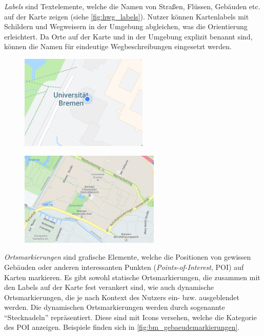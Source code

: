 \emph{Labels} sind Textelemente, welche die Namen von Straßen, Flüssen, Gebäuden etc. auf der Karte zeigen (siehe \autoref{fig:hwg_labels}).
Nutzer können Kartenlabels mit Schildern und Wegweisern in der Umgebung abgleichen, was die Orientierung erleichtert.
Da Orte auf der Karte und in der Umgebung explizit benannt sind, können die Namen für eindeutige Wegbeschreibungen eingesetzt werden.
\begin{figure}[h]
    \centering
    \begin{minipage}[t]{.485\textwidth}
        \centering
        \vspace{0pt}
        \includegraphics[width=\linewidth, height=4.5cm]{figures/map-app_examples/gm_positionsmarker}
        \label{fig:gm_positionsmarker}
        \vfill
    \end{minipage}
    \hfill
    \begin{minipage}[t]{.485\textwidth}
        \centering
        \vspace{0pt}
        \includegraphics[width=\linewidth, height=4.5cm]{figures/map-app_examples/hwg_labels}
        \label{fig:hwg_labels}
    \end{minipage}
\end{figure}

\emph{Ortsmarkierungen} sind grafische Elemente, welche die Positionen von gewissen Gebäuden oder anderen interessanten Punkten (\emph{Points-of-Interest}, POI) auf Karten markieren.
Es gibt sowohl statische Ortsmarkierungen, die zusammen mit den Labels auf der Karte fest verankert sind, wie auch dynamische Ortsmarkierungen, die je nach Kontext des Nutzers ein- bzw. ausgeblendet werden.
Die dynamischen Ortsmarkierungen werden durch sogenannte \enquote{Stecknadeln} repräsentiert.
Diese sind mit Icons versehen, welche die Kategorie des POI anzeigen.
Beispiele finden sich in \autoref{fig:bm_gebaeudemarkierungen}.

